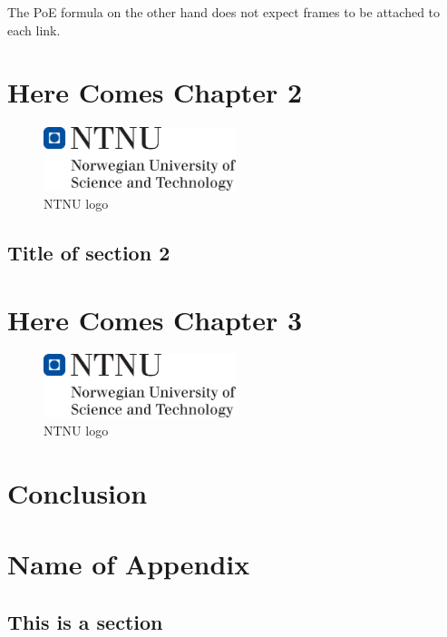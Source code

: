 \documentclass{tpk4170report}
\begin{document}
The PoE formula on the other hand does not expect frames to be attached to each link. 
\chapter{Here Comes Chapter 2}

\Blindtext

\begin{figure}
  \centering
  \includegraphics[width=0.5\textwidth]{hovedlogo} 
  \caption{NTNU logo}
  \label{fig:logo2}
\end{figure}

\section{Title of section 2}








\chapter{Here Comes Chapter 3}

\Blindtext

\begin{figure}
  \centering
  \includegraphics[width=0.5\textwidth]{hovedlogo} 
  \caption{NTNU logo}
  \label{fig:logo}
\end{figure}





\chapter{Conclusion}

\blindtext[4]



\printbibliography[title=References]

\appendix
\chapter{Name of Appendix} 

\section{This is a section}
\end{document}
